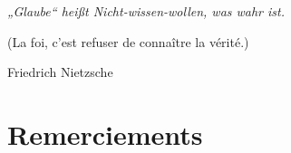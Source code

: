 \cleardoublepage\thispagestyle{empty}\vspace*{\fill}%
\begin{flushright}\begin{minipage}{0.7\textwidth}%
		\begin{flushright}\itshape%
			„Glaube“ heißt Nicht-wissen-wollen, was wahr ist.\par
			(La foi, c'est refuser de connaître la vérité.)
			\par{Friedrich Nietzsche}
		\end{flushright}
\end{minipage}\end{flushright}%
\vspace*{\fill}\clearpage\thispagestyle{empty}\vfill\cleardoublepage
	
\chapter*{Remerciements}

